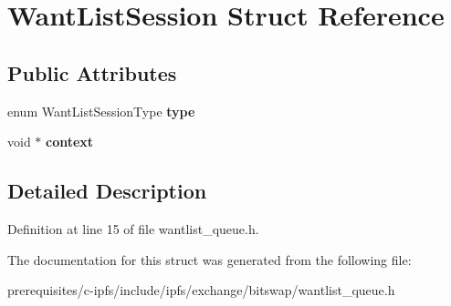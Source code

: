 \hypertarget{struct_want_list_session}{}\section{Want\+List\+Session Struct Reference}
\label{struct_want_list_session}
\subsection*{Public Attributes}
\begin{DoxyCompactItemize}
\item 
\mbox{\label{struct_want_list_session_a1dfd55a6f3fad0ce843659479997d5b4}} 
enum Want\+List\+Session\+Type {\bfseries type}
\item 
\mbox{\label{struct_want_list_session_a12bd08e0ea5195b327d18daa883e2da8}} 
void $\ast$ {\bfseries context}
\end{DoxyCompactItemize}


\subsection{Detailed Description}


Definition at line 15 of file wantlist\+\_\+queue.\+h.



The documentation for this struct was generated from the following file\+:\begin{DoxyCompactItemize}
\item 
prerequisites/c-\/ipfs/include/ipfs/exchange/bitswap/wantlist\+\_\+queue.\+h\end{DoxyCompactItemize}
